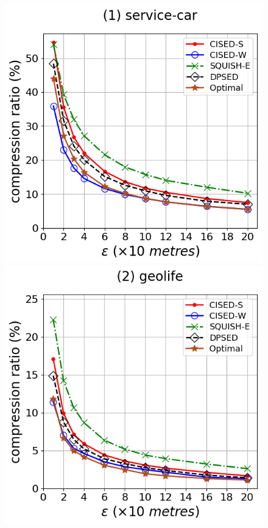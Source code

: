 \begin{figure}[tb!]
\centering
\includegraphics[scale = 0.275]{Figures/Exp-opt-CR-epsilon-service.png}\hspace{3ex}
\includegraphics[scale = 0.275]{Figures/Exp-opt-CR-epsilon-geolife.png}\hspace{3ex}

\end{figure}
